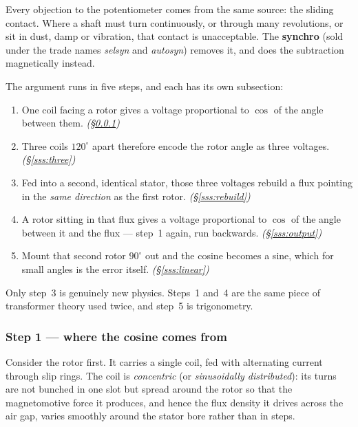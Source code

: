 \documentclass[11pt,a4paper]{article}
\begin{document}
Every objection to the potentiometer comes from the same source: the sliding
contact. Where a shaft must turn continuously, or through many revolutions, or
sit in dust, damp or vibration, that contact is unacceptable. The
\textbf{synchro} (sold under the trade names \emph{selsyn} and \emph{autosyn})
removes it, and does the subtraction magnetically instead.

The argument runs in five steps, and each has its own subsection:

\begin{enumerate}[leftmargin=2em,itemsep=1pt]
\item One coil facing a rotor gives a voltage proportional to $\cos$ of the
      angle between them. \emph{(\S\ref{sss:cosine})}
\item Three coils $120^\circ$ apart therefore encode the rotor angle as three
      voltages. \emph{(\S\ref{sss:three})}
\item Fed into a second, identical stator, those three voltages rebuild a flux
      pointing in the \emph{same direction} as the first rotor.
      \emph{(\S\ref{sss:rebuild})}
\item A rotor sitting in that flux gives a voltage proportional to $\cos$ of
      the angle between it and the flux --- step~1 again, run backwards.
      \emph{(\S\ref{sss:output})}
\item Mount that second rotor $90^\circ$ out and the cosine becomes a sine,
      which for small angles is the error itself.
      \emph{(\S\ref{sss:linear})}
\end{enumerate}

Only step~3 is genuinely new physics. Steps~1 and~4 are the same piece of
transformer theory used twice, and step~5 is trigonometry.

\subsubsection{Step 1 --- where the cosine comes from}
\label{sss:cosine}

Consider the rotor first. It carries a single coil, fed with alternating
current through slip rings. The coil is \emph{concentric} (or
\emph{sinusoidally distributed}): its turns are not bunched in one slot but
spread around the rotor so that the magnetomotive force it produces, and
hence the flux density it drives across the air gap, varies smoothly around
the stator bore rather than in steps.
\end{document}
